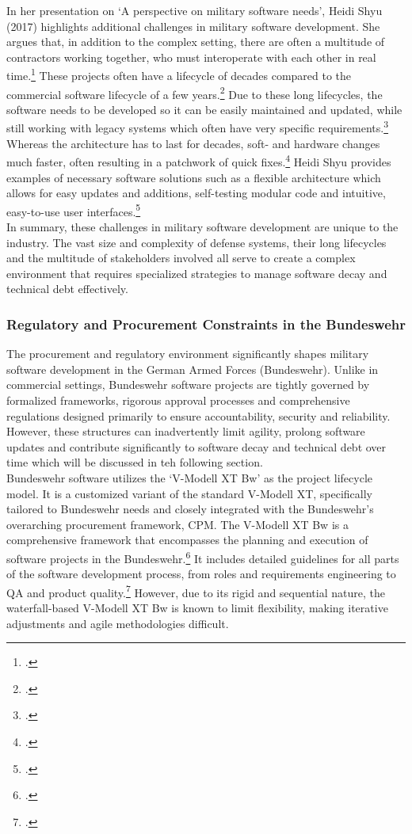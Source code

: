 In her presentation on `A perspective on military software needs', Heidi Shyu (2017) highlights additional challenges in military software development.
She argues that, in addition to the complex setting, there are often a multitude of contractors working together, who must interoperate with each other in real time.\footcite[11]{shyu2017military}
These projects often have a lifecycle of decades compared to the commercial software lifecycle of a few years.\footcite[14]{shyu2017military}
Due to these long lifecycles, the software needs to be developed so it can be easily maintained and updated, while still working with legacy systems
which often have very specific requirements.\footcite[14]{shyu2017military}
Whereas the architecture has to last for decades, soft- and hardware changes much faster, often resulting in a patchwork of quick fixes.\footcite[15]{shyu2017military}
Heidi Shyu provides examples of necessary software solutions such as a flexible architecture which allows for easy updates and additions, self-testing modular code and intuitive, easy-to-use user interfaces.\footcite[17]{shyu2017military}\\

In summary, these challenges in military software development are unique to the industry. The vast size and complexity of defense systems,
their long lifecycles and the multitude of stakeholders involved all serve to create a complex environment that requires specialized strategies to manage software decay and technical debt effectively.

\subsubsection{Regulatory and Procurement Constraints in the Bundeswehr}
The procurement and regulatory environment significantly shapes military software development in the German Armed Forces (Bundeswehr). Unlike in commercial settings,
Bundeswehr software projects are tightly governed by formalized frameworks, rigorous approval processes and comprehensive regulations designed primarily to ensure 
accountability, security and reliability. However, these structures can inadvertently limit agility, prolong software updates and contribute significantly to software decay
and technical debt over time which will be discussed in teh following section.\\

Bundeswehr software utilizes the `V-Modell XT Bw' as the project lifecycle model. It is a customized variant of the standard V-Modell XT, specifically tailored to Bundeswehr needs and closely integrated with the 
Bundeswehr's overarching procurement framework, \ac{CPM}.
The V-Modell XT Bw is a comprehensive framework that encompasses the planning and execution of software projects in the Bundeswehr.\footcite[6]{bundeswehrVModellXTBw}
It includes detailed guidelines for all parts of the software development process, from roles and requirements engineering to \ac{QA} and product quality.\footcite[pp. 20-21]{bundeswehrVModellXTBw}
However, due to its rigid and sequential nature, the waterfall-based V-Modell XT Bw is known to limit flexibility, making iterative adjustments and agile methodologies difficult.\\

